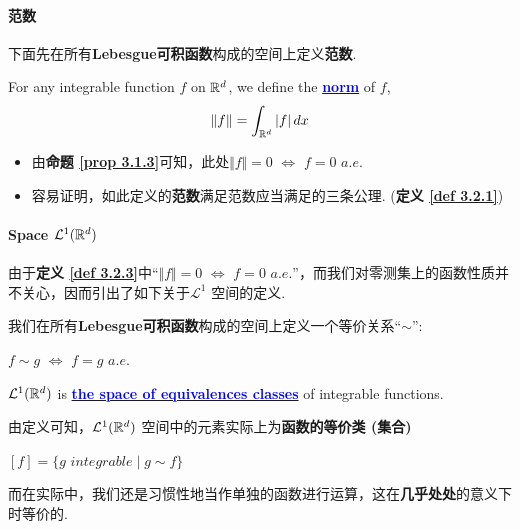 \paragraph{范数}
	下面先在所有\textbf{Lebesgue可积函数}构成的空间上定义\textbf{范数}.
	\begin{defn}\label{def 3.2.3}
		For any integrable function $f$ on $\mathbb{R}^d$, we define the \underline{\textcolor{blue}{\textbf{norm}}} of $f$,
		\begin{align}
			\Vert f \Vert = \int_{\mathbb{R}^d}{\left| f \right| dx}
		\end{align}
	
		\vspace{1em}
		\begin{rmk}
			\begin{itemize}
				\item 由\textbf{命题 \ref{prop 3.1.3}}可知，此处$\Vert f \Vert = 0 \,\, \Leftrightarrow \,\, f = 0 \,\, a.e.$
				
				\vspace{1em}
				
				\item 容易证明，如此定义的\textbf{范数}满足范数应当满足的三条公理. (\textbf{定义 \ref{def 3.2.1}})
			\end{itemize}
		\end{rmk}
	\end{defn}

\newpage
\paragraph{\textbf{Space $\mathcal{L}^{1}(\mathbb{R}^d)$}}
	由于\textbf{定义 \ref{def 3.2.3}}中“$\Vert f \Vert = 0 \,\, \Leftrightarrow \,\, f = 0 \,\, a.e.$”，而我们对零测集上的函数性质并不关心，因而引出了如下关于$\mathcal{L}^1$ 空间的定义.
	\begin{defn}\label{def 3.2.4}
		我们在所有\textbf{Lebesgue可积函数}构成的空间上定义一个等价关系“$\sim$”:
		\begin{center}
			$f \sim g \,\, \Leftrightarrow \,\, f = g \,\, a.e.$
		\end{center}
		\textcolor{blue}{$\mathcal{L}^{1}(\mathbb{R}^d)$} is \underline{\textcolor{blue}{\textbf{the space of equivalences classes}}} of integrable functions.
		
		\vspace{2em}
		\begin{rmk}
			由定义可知，$\mathcal{L}^{1}(\mathbb{R}^d)$ 空间中的元素实际上为\textbf{函数的等价类 (集合)}
			\begin{center}
				$[f] = \{ g \,\, integrable \mid g \sim f \}$
			\end{center}
			而在实际中，我们还是习惯性地当作单独的函数进行运算，这在\textbf{几乎处处}的意义下时等价的.
		\end{rmk}
	\end{defn}


